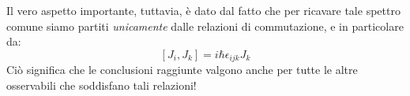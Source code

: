 \documentclass[../../FisicaTeorica.tex]{subfiles}
\begin{document}
Il vero aspetto importante, tuttavia, è dato dal fatto che per ricavare tale spettro comune siamo partiti \textit{unicamente} dalle relazioni di commutazione, e in particolare da:
\[
[J_i, J_k] = i\hbar \epsilon_{ijk} J_k
\]
Ciò significa che le conclusioni raggiunte valgono anche per tutte le altre osservabili che soddisfano tali relazioni! 
\end{document}
